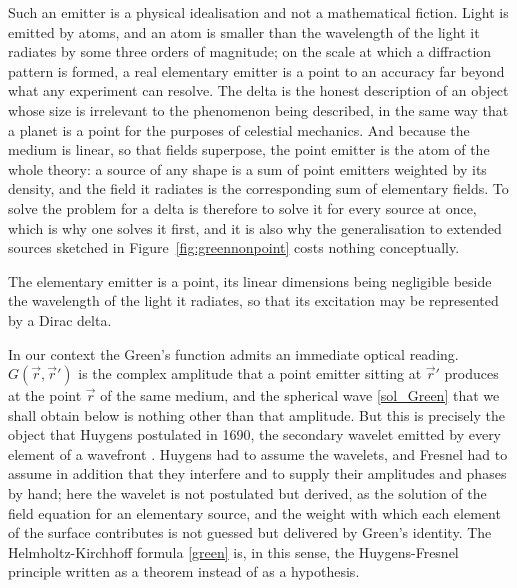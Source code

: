 		Such an emitter is a physical idealisation and not a mathematical fiction. Light is emitted by atoms, and an atom is smaller than the wavelength of the light it radiates by some three orders of magnitude; on the scale at which a diffraction pattern is formed, a real elementary emitter is a point to an accuracy far beyond what any experiment can resolve. The delta is the honest description of an object whose size is irrelevant to the phenomenon being described, in the same way that a planet is a point for the purposes of celestial mechanics. And because the medium is linear, so that fields superpose, the point emitter is the atom of the whole theory: a source of any shape is a sum of point emitters weighted by its density, and the field it radiates is the corresponding sum of elementary fields. To solve the problem for a delta is therefore to solve it for every source at once, which is why one solves it first, and it is also why the generalisation to extended sources sketched in Figure~\ref{fig:greennonpoint} costs nothing conceptually.

		\begin{Assumption}
			The elementary emitter is a point, its linear dimensions being negligible beside the wavelength of the light it radiates, so that its excitation may be represented by a Dirac delta.
		\end{Assumption}


		In our context the Green's function admits an immediate optical reading. $G(\vec{r},\vec{r}')$ is the complex amplitude that a point emitter sitting at $\vec{r}'$ produces at the point $\vec{r}$ of the same medium, and the spherical wave \eqref{sol_Green} that we shall obtain below is nothing other than that amplitude. But this is precisely the object that Huygens postulated in 1690, the secondary wavelet emitted by every element of a wavefront \citep{huygens1690traite}. Huygens had to assume the wavelets, and Fresnel had to assume in addition that they interfere and to supply their amplitudes and phases by hand; here the wavelet is not postulated but derived, as the solution of the field equation for an elementary source, and the weight with which each element of the surface contributes is not guessed but delivered by Green's identity. The Helmholtz-Kirchhoff formula \eqref{green} is, in this sense, the Huygens-Fresnel principle written as a theorem instead of as a hypothesis.

